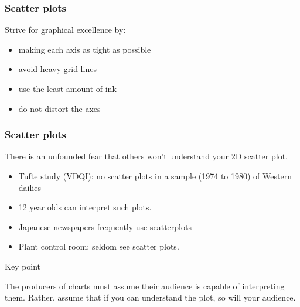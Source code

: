 
\begin{frame}\frametitle{Scatter plots}
	Strive for graphical excellence by:
	\begin{itemize}
		\item	making each axis as tight as possible 
		\item	avoid heavy grid lines 
		\item	use the least amount of ink 
		\item	do not distort the axes 
	\end{itemize}
\end{frame}

\begin{frame}\frametitle{Scatter plots}
	There is an unfounded fear that others won't understand your 2D scatter plot. 
	\begin{itemize}
		\item	Tufte study (VDQI): no scatter plots in a sample (1974 to 1980) of Western dailies 
		\item	12 year olds can interpret such plots. 
		\item	Japanese newspapers frequently use scatterplots 
		\item	Plant control room: seldom see scatter plots. 
	\end{itemize}
	\begin{block}
		{Key point} 
		\begin{center}
			The producers of charts must assume their audience is capable of interpreting them. Rather, assume that if you can understand the plot, so will your audience. 
		\end{center}
	\end{block}
\end{frame}

